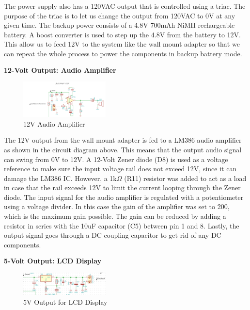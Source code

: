 \documentclass[journal,compsoc]{IEEEtran}
\begin{document}
The power supply also has a 120VAC output that is controlled using a triac. The purpose of the triac is to let us change the output from 120VAC to 0V at any given time. The backup power consists of a 4.8V 700mAh NiMH rechargeable battery. A boost converter is used to step up the 4.8V from the battery to 12V. This allow us to feed 12V to the system like the wall mount adapter so that we can repeat the whole process to power the components in backup battery mode.

\textbf {12-Volt Output: Audio Amplifier }

\begin{figure}[ht]	%
\centering
\includegraphics[width=0.4\textwidth]{Audio.png}
\caption{ 12V Audio Amplifier}
\label{Paudio}
\end{figure}

The 12V output from the wall mount adapter is fed to a LM386 audio amplifier as shown in the circuit diagram above. This means that the output audio signal can swing from 0V to 12V. A 12-Volt Zener diode (D8) is used as a voltage reference to make sure the input voltage rail does not exceed 12V, since it can damage the LM386 IC. However, a 1k$\Omega$ (R11) resistor was added to act as a load in case that the rail exceeds 12V to limit the current looping through the Zener diode. The input signal for the audio amplifier is regulated with a potentiometer using a voltage divider. In this case the gain of the amplifier was set to 200, which is the maximum gain possible. The gain can be reduced by adding a resistor in series with the 10uF capacitor (C5) between pin 1 and 8. Lastly, the output signal goes through a DC coupling capacitor to get rid of any DC components. 


\textbf {5-Volt Output: LCD Display}

\begin{figure}[ht]	%
\centering
\includegraphics[width=0.4\textwidth]{Linear.png}
\caption{ 5V Output for LCD Display }
\label{Pdisplay}
\end{figure}
\end{document}

